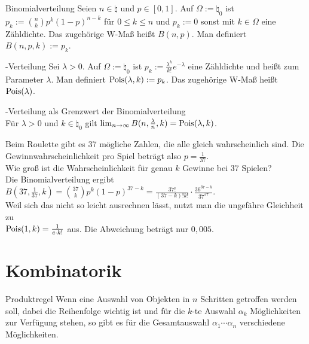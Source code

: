 \linie
\pagebreak

\begin{Def}{Binomialverteilung}
    Seien $n \in \natural$ und $p \in [0, 1]$.
    Auf $\Omega := \natural_0$ ist $p_k := \binom{n}{k} p^k (1 - p)^{n-k}$ für $0 \le k \le n$
    und $p_k := 0$ sonst mit $k \in \Omega$ eine Zähldichte.
    Das zugehörige W-Maß heißt  $B(n, p)$.
    Man definiert $B(n, p, k) := p_k$.
\end{Def}

\begin{Def}{-Verteilung}
    Sei $\lambda > 0$.
    Auf $\Omega := \natural_0$ ist $p_k := \frac{\lambda^k}{k!} e^{-\lambda}$ eine Zähldichte
    und heißt  zum Parameter $\lambda$.
    Man definiert $\text{Pois}(\lambda, k) := p_k$.
    Das zugehörige W-Maß heißt  $\text{Pois}(\lambda)$.
\end{Def}

\begin{Satz}{-Verteilung als Grenzwert der Binomialverteilung}\\
    Für $\lambda > 0$ und $k \in \natural_0$ gilt
    $\lim_{n \to \infty} B(n, \frac{\lambda}{n}, k) = \text{Pois}(\lambda, k)$.
\end{Satz}

\begin{Bsp}
    Beim Roulette gibt es 37 mögliche Zahlen, die alle gleich wahrscheinlich sind.
    Die Gewinnwahrscheinlichkeit pro Spiel beträgt also $p = \frac{1}{37}$.\\
    Wie groß ist die Wahrscheinlichkeit für genau $k$ Gewinne bei 37 Spielen?\\
    Die Binomialverteilung ergibt $B(37, \frac{1}{37}, k) = \binom{37}{k} p^k (1 - p)^{37-k} =
    \frac{37!}{(37 - k)! k!} \cdot \frac{36^{37-k}}{37^{37}}$.\\
    Weil sich das nicht so leicht ausrechnen lässt, nutzt man die ungefähre Gleichheit zu\\
    $\text{Pois}(1, k) = \frac{1}{e \cdot k!}$ aus.
    Die Abweichung beträgt nur $0{,}005$.
\end{Bsp}

\section{%
    Kombinatorik%
}

\begin{Satz}{Produktregel}
    Wenn eine Auswahl von Objekten in $n$ Schritten getroffen werden soll, dabei die Reihenfolge
    wichtig ist und für die $k$-te Auswahl $\alpha_k$ Möglichkeiten zur Verfügung stehen,
    so gibt es für die Gesamtauswahl $\alpha_1  \dotsm \alpha_n$ verschiedene
    Möglichkeiten.
\end{Satz}

